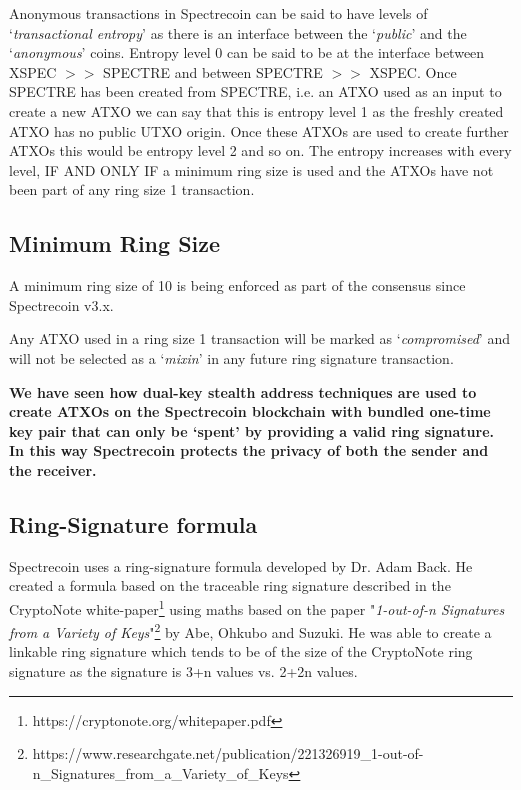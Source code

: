 Anonymous transactions in Spectrecoin can be said to have levels of
‘\textit{transactional entropy}’ as there is an interface between the ‘\textit{public}’
and the ‘\textit{anonymous}’ coins. Entropy level 0 can be said to be at the
interface between XSPEC $>>$ SPECTRE and between SPECTRE $>>$ XSPEC. Once
SPECTRE has been created from SPECTRE, i.e. an ATXO used as an input to
create a new ATXO we can say that this is entropy level 1 as the freshly
created ATXO has no public UTXO origin. Once these ATXOs are used to
create further ATXOs this would be entropy level 2 and so on. The entropy
increases with every level, IF AND ONLY IF a minimum ring size is used and
the ATXOs have not been part of any ring size 1 transaction.




\subsection{Minimum Ring Size}

A minimum ring size of 10 is being enforced as part of the consensus since 
Spectrecoin v3.x.



Any ATXO used in a ring size 1 transaction will be marked as 
‘\textit{compromised}’ and will not be selected as a ‘\textit{mixin}’ 
in any future ring signature transaction.



\textbf{We have seen how dual-key stealth address techniques are used to 
create ATXOs on the Spectrecoin blockchain with bundled one-time key pair 
that can only be ‘spent’ by providing a valid ring signature. In this way 
Spectrecoin protects the privacy of both the sender and the receiver.}



\subsection{Ring-Signature formula}
Spectrecoin uses a ring-signature formula developed by Dr. Adam Back. He 
created a formula based on the traceable ring signature described in the 
CryptoNote white-paper\footnote{https://cryptonote.org/whitepaper.pdf} 
using maths based on the paper "\textit{1-out-of-n Signatures from a Variety of Keys}"\footnote{https://www.researchgate.net/publication/221326919\_1-out-of-n\_Signatures\_from\_a\_Variety\_of\_Keys} 
by Abe, Ohkubo and Suzuki. He was able to create a linkable ring signature 
which tends to be  of the size of the CryptoNote ring signature 
as the signature is 3+n values vs. 2+2n values. 



